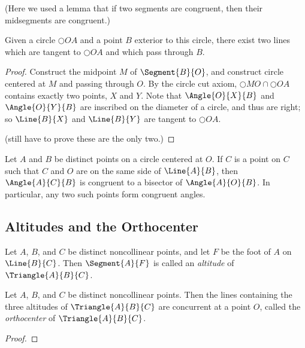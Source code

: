 \documentclass{article}
\begin{document}
(Here we used a lemma that if two segments are congruent, then their midsegments are congruent.)

\begin{construct}
Given a circle $\Circle{O}{A}$ and a point $B$ exterior to this circle, there exist two lines which are tangent to $\Circle{O}{A}$ and which pass through $B$.
\end{construct}

\begin{proof}
Construct the midpoint $M$ of $\Segment{B}{O}$, and construct circle centered at $M$ and passing through $O$. By the circle cut axiom, $\Circle{M}{O} \cap \Circle{O}{A}$ contains exactly two points, $X$ and $Y$. Note that $\Angle{O}{X}{B}$ and $\Angle{O}{Y}{B}$ are inscribed on the diameter of a circle, and thus are right; so $\Line{B}{X}$ and $\Line{B}{Y}$ are tangent to $\Circle{O}{A}$.

(still have to prove these are the only two.)
\end{proof}

\begin{prop}
Let $A$ and $B$ be distinct points on a circle centered at $O$. If $C$ is a point on $C$ such that $C$ and $O$ are on the same side of $\Line{A}{B}$, then $\Angle{A}{C}{B}$ is congruent to a bisector of $\Angle{A}{O}{B}$. In particular, any two such points form congruent angles.
\end{prop}

\subsection*{Altitudes and the Orthocenter}

\begin{dfn}
Let $A$, $B$, and $C$ be distinct noncollinear points, and let $F$ be the foot of $A$ on $\Line{B}{C}$. Then $\Segment{A}{F}$ is called an \emph{altitude} of $\Triangle{A}{B}{C}$. 
\end{dfn}

\begin{prop}
Let $A$, $B$, and $C$ be distinct noncollinear points. Then the lines containing the three altitudes of $\Triangle{A}{B}{C}$ are concurrent at a point $O$, called the \emph{orthocenter} of $\Triangle{A}{B}{C}$. 
\end{prop}

\begin{proof}

\end{proof}
\end{document}
